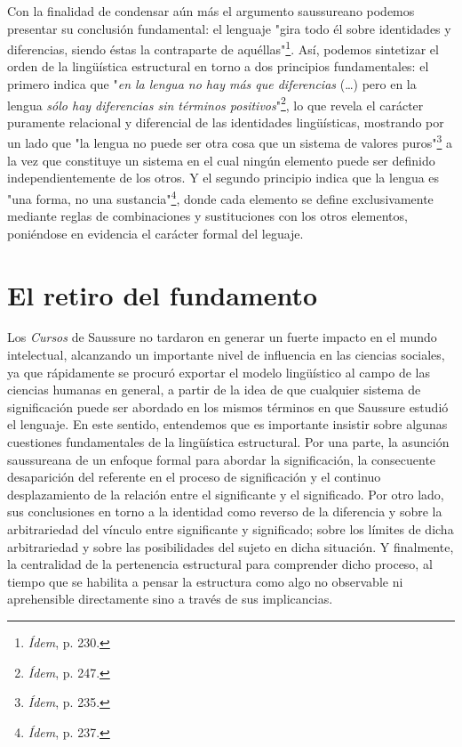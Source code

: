 \documentclass{book}
\begin{document}
Con la finalidad de condensar aún más el argumento saussureano podemos
presentar su conclusión fundamental: el lenguaje "gira todo él sobre
identidades y diferencias, siendo éstas la contraparte de
aquéllas"\footnote{\emph{Ídem}, p. 230.}. Así, podemos sintetizar el
orden de la lingüística estructural en torno a dos principios
fundamentales: el primero indica que "\emph{en la lengua no hay más que
diferencias} (\dots) pero en la lengua \emph{sólo hay diferencias
sin términos positivos}"\footnote{\emph{Ídem}, p. 247.}, lo que revela
el carácter puramente relacional y diferencial de las identidades
lingüísticas, mostrando por un lado que "la lengua no puede ser otra
cosa que un sistema de valores puros"\footnote{\emph{Ídem}, p. 235.} a
la vez que constituye un sistema en el cual ningún elemento puede ser
definido independientemente de los otros. Y el segundo principio indica
que la lengua es "una forma, no una sustancia"\footnote{\emph{Ídem}, p.
  237.}, donde cada elemento se define exclusivamente mediante reglas de
combinaciones y sustituciones con los otros elementos, poniéndose en
evidencia el carácter formal del leguaje.

\hypertarget{el-retiro-del-fundamento}{%
\section{El retiro del fundamento}\label{el-retiro-del-fundamento}}

Los \emph{Cursos} de Saussure no tardaron en generar un fuerte impacto
en el mundo intelectual, alcanzando un importante nivel de influencia en
las ciencias sociales, ya que rápidamente se procuró exportar el modelo
lingüístico al campo de las ciencias humanas en general, a partir de la
idea de que cualquier sistema de significación puede ser abordado en los
mismos términos en que Saussure estudió el lenguaje. En este sentido,
entendemos que es importante insistir sobre algunas cuestiones
fundamentales de la lingüística estructural. Por una parte, la asunción
saussureana de un enfoque formal para abordar la significación, la
consecuente desaparición del referente en el proceso de significación y
el continuo desplazamiento de la relación entre el significante y el
significado. Por otro lado, sus conclusiones en torno a la identidad
como reverso de la diferencia y sobre la arbitrariedad del vínculo entre
significante y significado; sobre los límites de dicha arbitrariedad y
sobre las posibilidades del sujeto en dicha situación. Y finalmente, la
centralidad de la pertenencia estructural para comprender dicho proceso,
al tiempo que se habilita a pensar la estructura como algo no observable
ni aprehensible directamente sino a través de sus implicancias.
\end{document}
